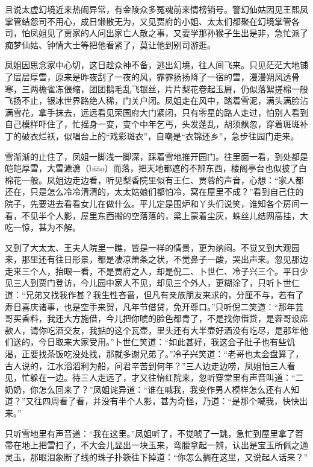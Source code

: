 \documentclass[12pt,oneside]{book}
\begin{document}
且说太虚幻境近来热闹异常，有金陵众多冤魂前来情榜销号。警幻仙姑因见王熙凤掌管结怨司不用心，成日懒散无为，又见贾府的小姐、太太们都聚在幻境掌管各司，怕凤姐见了贾家的人问出家亡人散之事，又要学那孙猴子生出是非，急忙派了痴梦仙姑、钟情大士等把他看紧了，莫让他到别司游逛。

凤姐因思念家中心切，这日趁众神不备，逃出幻境，往人间飞来。只见茫茫大地铺了层层厚雪，原来是昨夜刮了一夜的风，霏霏扬扬降了一宿的雪，漫漫朔风透骨寒，三两檐雀冻偎缩，团团鹅毛乱飞银丝，片片梨花卷起玉屑，仍似落絮搓棉一般飞扬不止，银冰世界路绝人稀，门关户闭。凤姐走在风中，踏着雪泥，满头满脸沾满雪花，拿手抹去，远远看见荣国府大门紧闭，只有零星的路人走过，怕别人看到自己模样吓住了，忙摇身一变，变个中年乞丐，头发蓬乱，胡须飘忽，穿着斑斑补丁的破衣烂袄，似唱台上的“戏彩斑衣”，自嘲是“衣锦还乡”，急步往园门走来。

雪渐渐的止住了，凤姐一脚浅一脚深，踩着雪地推开园门。往里面一看，到处都是皑皑厚雪，大雪瀌瀌（biāo）而落，把天地都遮的不辨东西，楼阁亭台也似披了白棉花一般。凤姐边走边看，听见梨香院里似有王仁、贾蓉的声音，心想：“家人都还在，只是怎么冷冷清清的，太太姑娘们都怕冷，窝在屋里不成？”看到自己住的院子，先要进去看看女儿在做什么。平儿定是围炉和丫头们说笑，谁知各个房间一看，不见半个人影，屋里东西搬的空落落的，梁上蒙着尘灰，蛛丝儿结网高挂，大吃一惊，甚为不解。

又到了大太太、王夫人院里一瞧，皆是一样的情景，更为纳闷。不觉又到大观园来，那里还有往日形景，都是凄凉萧条之状，不觉鼻子一酸，哭出声来。忽见那边走来三个人，抬眼一看，不是贾府之人，却是倪二、卜世仁、冷子兴三个。平日少见三人到贾门登访，今儿园中家人不见，却见三个外人，更糊涂了，只听卜世仁道：“兄弟又找我作甚？我生性吝啬，但凡有亲族朋友来求的，分厘不与，若有了寿日喜庆诸事，也是空手来贺，凡年节借贷，免开尊口。”只听倪二笑道：“那年芸哥买香料，我还大方施借，今儿把你唬的脸色都青了，不是找你借贷，是蓉哥设席款人，请你吃酒交友，我掂的这个瓦壶，里头还有大半壶好酒没有吃尽，是那年他们送的，今日取来大家受用。”卜世仁笑道：“如此甚好，我这会子肚子也有些饥渴，正要找茶饭吃没处找，那就多谢兄弟了。”冷子兴笑道：“老哥也太会盘算了，古人说的，江水滔滔利为船，问君辛苦到何年？”三人边走边唠，凤姐怕三人看见，忙躲在一边。待三人走远了，才又往怡红院来，忽听穿堂里有声音叫道：“二奶奶，你怎么回来了？”凤姐诧异道：“谁在喊我，我变作男人模样怎么还有人知道？”又往四周看了看，并没有半个人影，甚为奇怪，乃道：“是那个喊我，快快出来。”

只听雪地里有声音道：“我在这里。”凤姐听了，不觉唬了一跳，急忙到屋里拿了笤帚在地上把雪扫了，不大会儿显出一块玉来，弯腰拿起一辨，认出是宝玉所佩之通灵玉，那眼泪象断了线的珠子扑簌往下掉道：“你怎么搁在这里，又说起人话来？”
\end{document}
